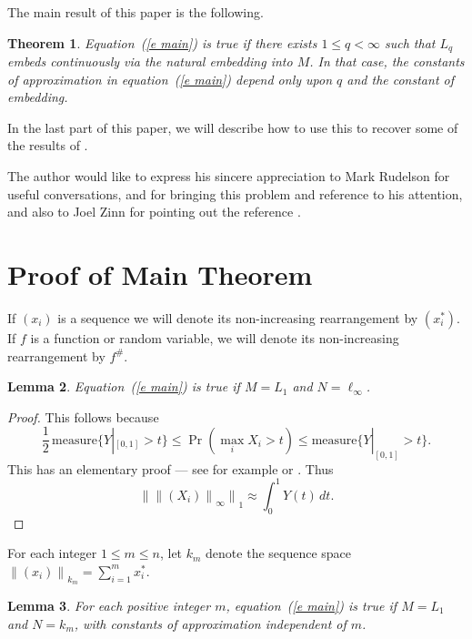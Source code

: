 \documentclass[12pt]{amsart}
\newtheorem{thm}{Theorem}
\newtheorem{lemma}[thm]{Lemma}
\newcommand{\snormo}[1]{{\mathopen\|#1\mathclose\|}}
\newcommand{\measure}{\text{measure}}
\begin{document}
The main result of this paper is the following.

\begin{thm}
\label{t main}
Equation~(\ref{e main}) is true if there exists $1\le q < \infty$ such that 
$L_q$ embeds continuously via
the natural embedding into $M$.  
In that case, the constants of approximation
in equation~(\ref{e main})
depend only upon $q$ and the constant of embedding.
\end{thm}

In the last part of this paper,
we will describe how to use this to recover some of the results of 
\cite{gordon et al}.

The author would like to express his sincere appreciation to Mark Rudelson
for useful conversations, and 
for bringing this problem and reference \cite{gordon et al} to his attention,
and also to Joel Zinn for pointing out the reference \cite{marcus-zinn}.

\section{Proof of Main Theorem}

If $(x_i)$ is a sequence we will denote its non-increasing rearrangement
by $(x^*_i)$.  
If $f$ is a function or random variable, we will denote
its non-increasing rearrangement by $f^\#$.

\begin{lemma}
\label{l L_1 l_infty}
Equation~(\ref{e main}) is true if $M = L_1$ and $N = \ell_\infty$.
\end{lemma}

\begin{proof}
This follows because 
\begin{equation}
\label{e max in Pr}
    {\textstyle\frac12}\,\measure\{ Y|_{[0,1]} > t\}
    \le
    \Pr(\max_i X_i > t)
    \le
    \measure\{ Y|_{[0,1]} > t\} .
\end{equation}
This has an elementary proof --- 
see for example \cite[Proposition 2.1]{hitczenko-montgomery-smith} or
\cite{gine-zinn}.  
Thus
\begin{equation}
\label{e L_1 l_infty}
   \snormo{\snormo{(X_i)}_\infty}_1 \approx \int_0^1 Y(t) \, dt .
\end{equation}
\end{proof}

For each integer $1\le m\le n$, let $k_m$ denote the sequence space
$\snormo{(x_i)}_{k_m} = \sum_{i=1}^m x^*_i$.

\begin{lemma}
\label{l L_1 k_m}
For each positive integer $m$, 
equation~(\ref{e main}) is true if $M = L_1$ and $N = k_m$, with
constants of approximation independent of $m$.
\end{lemma}
\end{document}
